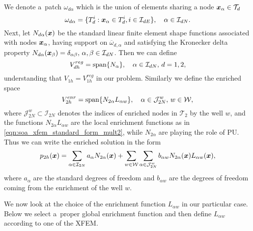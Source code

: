 We denote a~patch $\omega_{d\alpha}$ which is the union of elements sharing a node $\mathbf{\boldsymbol{x}}_\alpha\in\mathcal{T}_d$
\[
    \omega_{d\alpha} = \{ T_d^i: \mathbf{\boldsymbol{x}}_\alpha \in T_d^i, i\in\mathcal{I}_{dE}\}, \quad \alpha\in\mathcal{I}_{dN}.
\]
Next, let $N_{d \alpha}(\mathbf{\boldsymbol{x}})$ be the standard linear finite element shape functions associated with
nodes $\mathbf{\boldsymbol{x}}_\alpha$, having support on $\overbar\omega_{d,\alpha}$ and satisfying the Kronecker delta property
$N_{d \alpha}(\mathbf{\boldsymbol{x}}_\beta)=\delta_{\alpha\beta},\, \alpha,\beta\in\mathcal{I}_{dN}$.
Then we can define
\begin{equation}
    V_{dh}^{reg} = \textrm{span}\{N_\alpha\}, \quad \alpha\in\mathcal{I}_{dN},\, d=1,2,
\end{equation}
understanding that $V_{1h} = V_{1h}^{reg}$ in our problem.
Similarly we define the enriched space
\begin{equation}
    V_{2h}^{enr} = \textrm{span}\{N_{2\alpha} L_{\alpha w}\}, \quad \alpha\in\mathcal{J}^w_{2N},\, w\in\mathcal{W},
\end{equation}
where $\mathcal{J}^w_{2N}\subset\mathcal{I}_{2N}$ denotes the indices of enriched nodes in $\mathcal{T}_2$ 
by the well $w$, and
the functions $N_{2\alpha}L_{\alpha w}$ are the local enrichment functions as in \eqref{eqn:soa_xfem_standard_form_mult2},
while $N_{2\alpha}$ are playing the role of PU.
Thus we can write the enriched solution in the form
\begin{equation} \label{eqn:prim_xfem_standard_form}
  p_{2h}(\mathbf{\boldsymbol{x}}) = \sum_{\alpha\in\mathcal{I}_{2N}}a_\alpha N_{2\alpha}(\mathbf{\boldsymbol{x}})
    + \sum_{w\in\mathcal{W}} \sum_{\alpha\in\mathcal{J}^w_{2N}} b_{\alpha w} N_{2\alpha}(\mathbf{\boldsymbol{x}}) L_{\alpha w}(\mathbf{\boldsymbol{x}}),
\end{equation}
where $a_\alpha$ are the standard degrees of freedom and $b_{\alpha w}$ are the degrees of freedom coming from
the enrichment of the well $w$.

We now look at the choice of the enrichment function $L_{\alpha w}$ in our particular case.
Below we select a~proper global enrichment function and then define $L_{\alpha w}$ according
to one of the XFEM.




